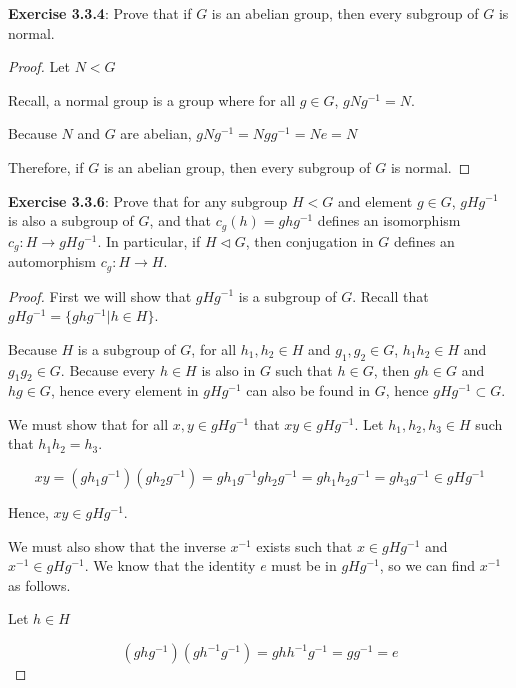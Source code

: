 \documentclass[a4paper]{article}
\begin{document}
\begin{myparindent}{0pt}
\textbf{Exercise 3.3.4}:
Prove that if $G$ is an abelian group, then every subgroup of $G$ is normal.
\newline

\begin{proof}

Let $N < G$

Recall, a normal group is a group where for all $g \in G$, $gNg^{-1} = N$.

Because $N$ and $G$ are abelian, $gNg^{-1} = Ngg^{-1} = Ne = N$

Therefore, if $G$ is an abelian group, then every subgroup of $G$ is normal.
\end{proof}

\textbf{Exercise 3.3.6}:
Prove that for any subgroup $H < G$ and element $g \in G$, $gHg^{-1}$ is also
a subgroup of $G$, and that $c_g(h) = ghg^{-1}$ defines an isomorphism
$c_g: H \rightarrow gHg^{-1}$. In particular, if $H \triangleleft G$, then
conjugation in $G$ defines an automorphism $c_g: H \rightarrow H$.
\newline

\begin{proof}
  First we will show that $gHg^{-1}$ is a subgroup of $G$. Recall that
  $gHg^{-1} = \{ ghg^{-1} | h \in H \}$. \newline

  Because $H$ is a subgroup of $G$, for all $h_1, h_2 \in H$ and $g_1, g_2 \in G$,
  $h_1 h_2 \in H$ and $g_1 g_2 \in G$. Because every $h \in H$ is also in $G$ such
  that $h \in G$, then $gh \in G$ and $hg \in G$, hence every element in $gHg^{-1}$
  can also be found in $G$, hence $gHg^{-1} \subset G$. \newline

  We must show that for all $x, y \in gHg^{-1}$ that $xy \in gHg^{-1}$.
  Let $h_1, h_2, h_3 \in H$ such that $h_1 h_2 = h_3$.

  \[ xy = (g h_1 g^{-1})(g h_2 g^{-1}) = g h_1 g^{-1}g h_2 g^{-1} = g h_1 h_2 g^{-1} = g h_3 g^{-1} \in gHg^{-1} \]

  Hence, $xy \in gHg^{-1}$. \newline

  We must also show that the inverse $x^{-1}$ exists such that $x \in gHg^{-1}$
  and $x^{-1} \in gHg^{-1}$.
  We know that the identity $e$ must be in $gHg^{-1}$, so we can find $x^{-1}$
  as follows. \newline

  Let $h \in H$

  \[ (ghg^{-1})(gh^{-1}g^{-1}) = ghh^{-1}g^{-1} = gg^{-1} = e \]


\end{proof}
\end{myparindent}
\end{document}
